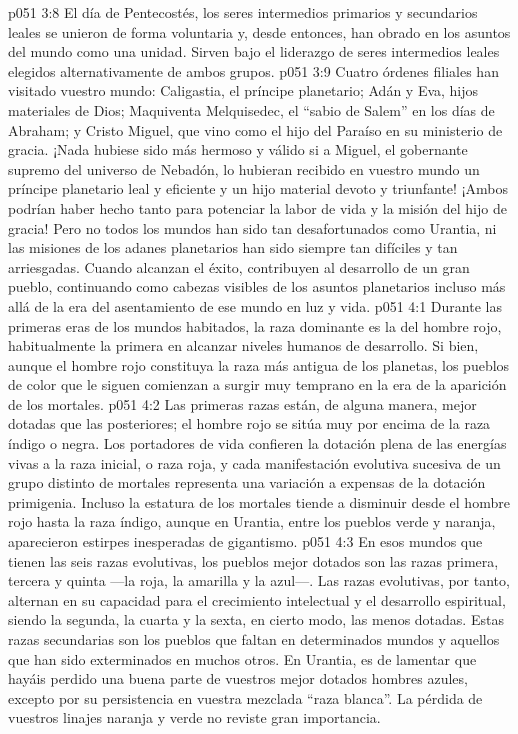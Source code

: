 \vs p051 3:8 El día de Pentecostés, los seres intermedios primarios y secundarios leales se unieron de forma voluntaria y, desde entonces, han obrado en los asuntos del mundo como una unidad. Sirven bajo el liderazgo de seres intermedios leales elegidos alternativamente de ambos grupos.
\vs p051 3:9 \pc Cuatro órdenes filiales han visitado vuestro mundo: Caligastia, el príncipe planetario; Adán y Eva, hijos materiales de Dios; Maquiventa Melquisedec, el “sabio de Salem” en los días de Abraham; y Cristo Miguel, que vino como el hijo del Paraíso en su ministerio de gracia. ¡Nada hubiese sido más hermoso y válido si a Miguel, el gobernante supremo del universo de Nebadón, lo hubieran recibido en vuestro mundo un príncipe planetario leal y eficiente y un hijo material devoto y triunfante! ¡Ambos podrían haber hecho tanto para potenciar la labor de vida y la misión del hijo de gracia! Pero no todos los mundos han sido tan desafortunados como Urantia, ni las misiones de los adanes planetarios han sido siempre tan difíciles y tan arriesgadas. Cuando alcanzan el éxito, contribuyen al desarrollo de un gran pueblo, continuando como cabezas visibles de los asuntos planetarios incluso más allá de la era del asentamiento de ese mundo en luz y vida.
\vs p051 4:1 Durante las primeras eras de los mundos habitados, la raza dominante es la del hombre rojo, habitualmente la primera en alcanzar niveles humanos de desarrollo. Si bien, aunque el hombre rojo constituya la raza más antigua de los planetas, los pueblos de color que le siguen comienzan a surgir muy temprano en la era de la aparición de los mortales.
\vs p051 4:2 Las primeras razas están, de alguna manera, mejor dotadas que las posteriores; el hombre rojo se sitúa muy por encima de la raza índigo o negra. Los portadores de vida confieren la dotación plena de las energías vivas a la raza inicial, o raza roja, y cada manifestación evolutiva sucesiva de un grupo distinto de mortales representa una variación a expensas de la dotación primigenia. Incluso la estatura de los mortales tiende a disminuir desde el hombre rojo hasta la raza índigo, aunque en Urantia, entre los pueblos verde y naranja, aparecieron estirpes inesperadas de gigantismo.
\vs p051 4:3 En esos mundos que tienen las seis razas evolutivas, los pueblos mejor dotados son las razas primera, tercera y quinta ---la roja, la amarilla y la azul---. Las razas evolutivas, por tanto, alternan en su capacidad para el crecimiento intelectual y el desarrollo espiritual, siendo la segunda, la cuarta y la sexta, en cierto modo, las menos dotadas. Estas razas secundarias son los pueblos que faltan en determinados mundos y aquellos que han sido exterminados en muchos otros. En Urantia, es de lamentar que hayáis perdido una buena parte de vuestros mejor dotados hombres azules, excepto por su persistencia en vuestra mezclada “raza blanca”. La pérdida de vuestros linajes naranja y verde no reviste gran importancia.
